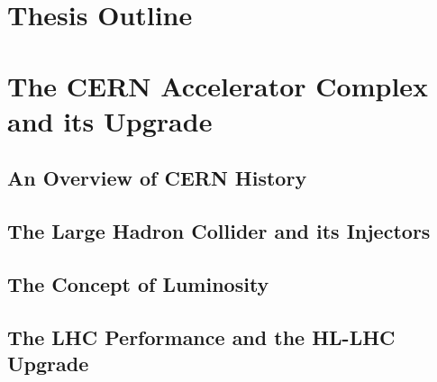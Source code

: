 \section{Thesis Outline}

\section{The CERN Accelerator Complex and its Upgrade}

\subsection{An Overview of CERN History}

\subsection{The Large Hadron Collider and its Injectors}

\subsection{The Concept of Luminosity}

\subsection{The LHC Performance and the HL-LHC Upgrade}
